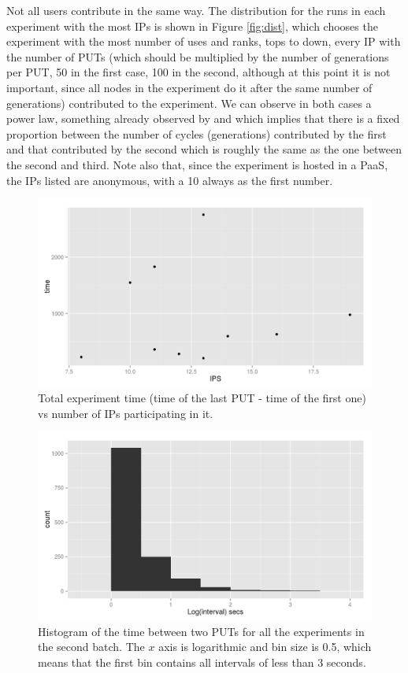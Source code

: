 \documentclass{sig-alternate}
\begin{document}
Not all users contribute in the same way. The distribution for the
runs in each experiment with the most IPs is shown in Figure
\ref{fig:dist}, which chooses the experiment with the most number of
uses and ranks, tops to down, every IP with the number of PUTs (which
should be multiplied by the number of generations per PUT, 50 in the
first case, 100 in the second, although at this point it is not
important, since all nodes in the experiment do it after the same
number of generations) contributed to the experiment. We can observe
in both cases a power law, something already observed by \cite{agajaj}
and which implies that there is a fixed proportion between the number
of cycles (generations) contributed by the first and that contributed
by the second which is roughly the same as the one between the second
and third. Note also that, since the experiment is hosted in a PaaS,
the IPs listed are anonymous, with a 10 always as the first number.
%
\begin{figure}[htb]
        \centering
        \includegraphics[width=0.8\linewidth]{data/time-vs-ips.png}
        \caption{Total experiment time (time of the last PUT - time of
        the first one) vs number of IPs participating in it.}\label{fig:t}
\end{figure}
%
\begin{figure}[htb]
        \centering
        \includegraphics[width=0.8\linewidth]{data/intervals-histo.png}
        \caption{Histogram of the time between two PUTs for all the
          experiments in the second batch. The $x$ axis is logarithmic
        and bin size is 0.5, which means that the first bin contains
        all intervals of less than 3 seconds.}\label{fig:intervals}
\end{figure}
\end{document}
